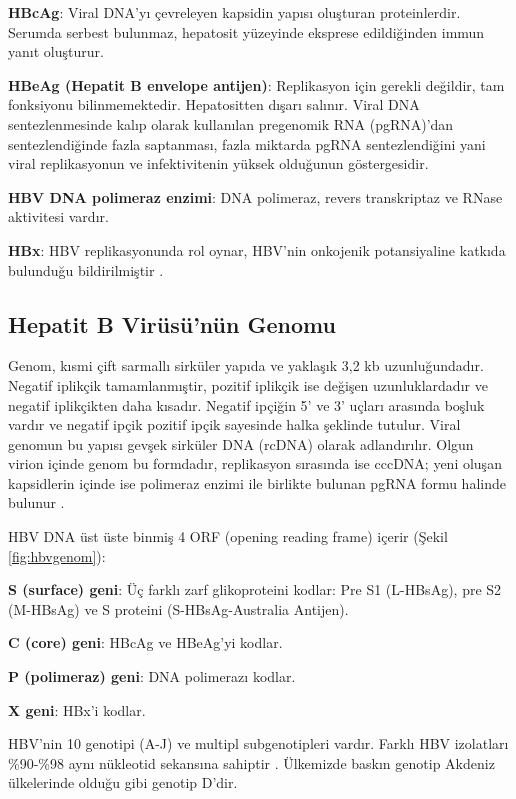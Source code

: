 \textbf{HBcAg}: Viral DNA'yı çevreleyen kapsidin yapısı oluşturan proteinlerdir. Serumda serbest bulunmaz, hepatosit yüzeyinde eksprese edildiğinden immun yanıt oluşturur. 

\textbf{HBeAg (Hepatit B envelope antijen)}: Replikasyon için gerekli değildir, tam fonksiyonu bilinmemektedir. Hepatositten dışarı salınır. Viral DNA sentezlenmesinde kalıp olarak kullanılan pregenomik RNA (pgRNA)'dan sentezlendiğinde fazla saptanması, fazla miktarda pgRNA sentezlendiğini yani viral replikasyonun ve infektivitenin yüksek olduğunun göstergesidir. 

\textbf{HBV DNA polimeraz enzimi}: DNA polimeraz, revers transkriptaz ve RNase aktivitesi vardır. 

\textbf{HBx}: HBV replikasyonunda rol oynar, HBV'nin onkojenik potansiyaline katkıda bulunduğu bildirilmiştir \cite{liang2009hepatitis}.


\subsection{Hepatit B Virüsü'nün Genomu}

Genom, kısmi çift sarmallı sirküler yapıda ve yaklaşık 3,2 kb uzunluğundadır. Negatif iplikçik tamamlanmıştir, pozitif iplikçik ise değişen uzunluklardadır ve negatif iplikçikten daha kısadır. Negatif ipçiğin 5' ve 3' uçları arasında boşluk vardır ve negatif ipçik pozitif ipçik sayesinde halka şeklinde tutulur. Viral genomun bu yapısı gevşek sirküler DNA (rcDNA) olarak adlandırılır. Olgun virion içinde genom bu formdadır, replikasyon sırasında ise cccDNA; yeni oluşan kapsidlerin içinde ise polimeraz enzimi ile birlikte bulunan pgRNA formu halinde bulunur \cite{enfeksiyonlar3willke}.

HBV DNA üst üste binmiş 4 ORF (opening reading frame) içerir (Şekil \ref{fig:hbvgenom}):

\textbf{S (surface) geni}: Üç farklı zarf glikoproteini kodlar: Pre S1 (L-HBsAg), pre S2 (M-HBsAg) ve S proteini (S-HBsAg-Australia Antijen). 

\textbf{C (core) geni}: HBcAg ve HBeAg'yi kodlar.

\textbf{P (polimeraz) geni}: DNA polimerazı kodlar.

\textbf{X geni}: HBx'i kodlar. 


HBV'nin 10 genotipi (A-J) ve multipl subgenotipleri vardır. Farklı HBV izolatları \%90-\%98 aynı nükleotid sekansına sahiptir \cite{jawetz2013adelberg}. Ülkemizde baskın genotip Akdeniz ülkelerinde olduğu gibi genotip D'dir.


